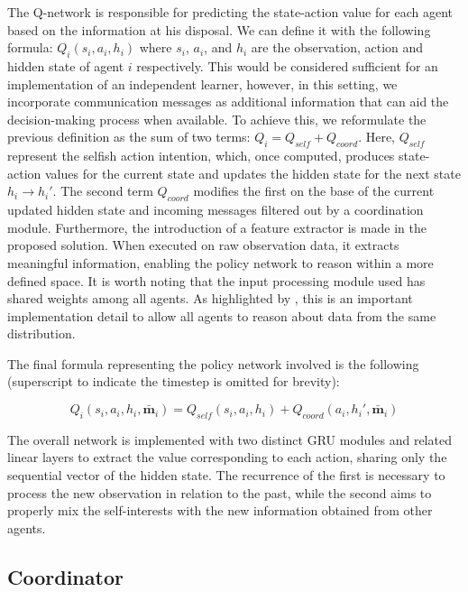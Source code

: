 \documentclass[a4paper,singleside,12pt]{report} %
\begin{document}
The Q-network is responsible for predicting the state-action value for each agent based on the information at his disposal. We can define it with the following formula: $Q_i(s_i,a_i,h_i)$ where $s_i$, $a_i$, and $h_i$ are the observation, action and hidden state of agent $i$ respectively. This would be considered sufficient for an implementation of an independent learner, however, in this setting, we incorporate communication messages as additional information that can aid the decision-making process when available. To achieve this, we reformulate the previous definition as the sum of two terms: $Q_i = Q_{self} + Q_{coord}$. Here, $Q_{self}$ represent the selfish action intention, which, once computed, produces state-action values for the current state and updates the hidden state for the next state $h_i \rightarrow h_i'$. The second term $Q_{coord}$ modifies the first on the base of the current updated hidden state and incoming messages filtered out by a coordination module. Furthermore, the introduction of a feature extractor is made in the proposed solution. When executed on raw observation data, it extracts meaningful information, enabling the policy network to reason within a more defined space. It is worth noting that the input processing module used has shared weights among all agents. As highlighted by \cite{Lin2021LearningTG}, this is an important implementation detail to allow all agents to reason about data from the same distribution.

The final formula representing the policy network involved is the following (superscript to indicate the timestep is omitted for brevity):

  \begin{equation}
    Q_i(s_i,a_i,h_i,\bar{\textbf{m}}_i) = Q_{self}(s_i,a_i,h_i) + Q_{coord}(a_i,h_i',\bar{\textbf{m}}_i)
  \end{equation}
  
  The overall network is implemented with two distinct GRU modules and related linear layers to extract the value corresponding to each action, sharing only the sequential vector of the hidden state. The recurrence of the first is necessary to process the new observation in relation to the past, while the second aims to properly mix the self-interests with the new information obtained from other agents.


\subsection{Coordinator}\label{coordinator}
\end{document}
